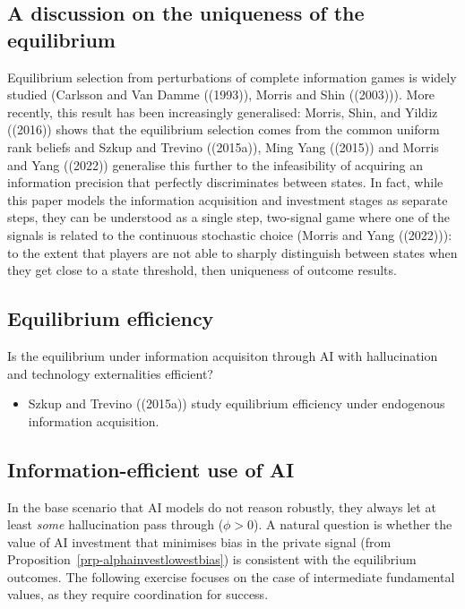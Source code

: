 \documentclass[
]{article}
\providecommand{\tightlist}{%
  \setlength{\itemsep}{0pt}\setlength{\parskip}{0pt}}\usepackage{longtable,booktabs,array}
\theoremstyle{plain}
\theoremstyle{definition}
\theoremstyle{remark}
\begin{document}
\hypertarget{a-discussion-on-the-uniqueness-of-the-equilibrium}{%
\subsection{A discussion on the uniqueness of the
equilibrium}\label{a-discussion-on-the-uniqueness-of-the-equilibrium}}

Equilibrium selection from perturbations of complete information games
is widely studied (Carlsson and Van Damme ((1993)), Morris and Shin
((2003))). More recently, this result has been increasingly generalised:
Morris, Shin, and Yildiz ((2016)) shows that the equilibrium selection
comes from the common uniform rank beliefs and Szkup and Trevino
((2015a)), Ming Yang ((2015)) and Morris and Yang ((2022)) generalise
this further to the infeasibility of acquiring an information precision
that perfectly discriminates between states. In fact, while this paper
models the information acquisition and investment stages as separate
steps, they can be understood as a single step, two-signal game where
one of the signals is related to the continuous stochastic choice
(Morris and Yang ((2022))): to the extent that players are not able to
sharply distinguish between states when they get close to a state
threshold, then uniqueness of outcome results.

\hypertarget{equilibrium-efficiency}{%
\subsection{Equilibrium efficiency}\label{equilibrium-efficiency}}

Is the equilibrium under information acquisiton through AI with
hallucination and technology externalities efficient?

\begin{itemize}
\tightlist
\item
  Szkup and Trevino ((2015a)) study equilibrium efficiency under
  endogenous information acquisition.
\end{itemize}

\hypertarget{information-efficient-use-of-ai}{%
\subsection{Information-efficient use of
AI}\label{information-efficient-use-of-ai}}

In the base scenario that AI models do not reason robustly, they always
let at least \emph{some} hallucination pass through (\(\phi > 0\)). A
natural question is whether the value of AI investment that minimises
bias in the private signal (from
Proposition~\ref{prp-alphainvestlowestbias}) is consistent with the
equilibrium outcomes. The following exercise focuses on the case of
intermediate fundamental values, as they require coordination for
success.
\end{document}
